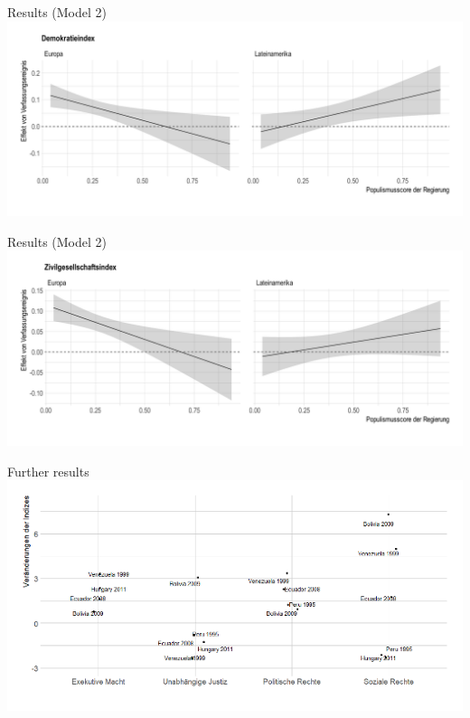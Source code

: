 \documentclass[xcolor=dvipsnames,aspectratio=169,12pt]{beamer}
\begin{document}
\begin{frame}{Results (Model 2)}
    \includegraphics[width=1\textwidth]{fig/populismscoreregIII}
\end{frame}


\begin{frame}{Results (Model 2)}
    \includegraphics[width=1\textwidth]{fig/populismscoreregIV}
\end{frame}

\begin{frame}{Further results}
    \includegraphics[width=1\textwidth]{fig/moreresults}
\end{frame}
\end{document}
